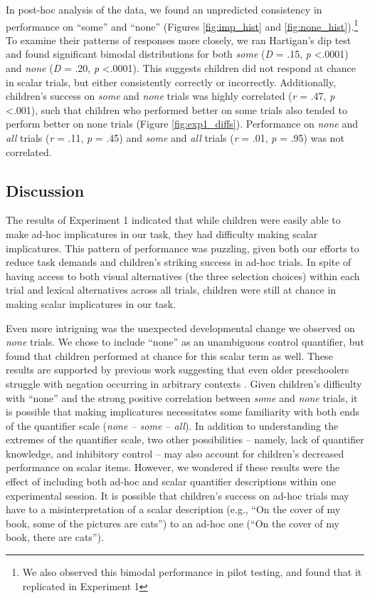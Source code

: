 \documentclass[man]{apa2}
\begin{document}
In post-hoc analysis of the data, we found an unpredicted consistency in performance on ``some'' and ``none'' (Figures \ref{fig:imp_hist} and \ref{fig:none_hist}).\footnote{We also observed this bimodal performance in pilot testing, and found that it replicated in Experiment 1}  To examine their patterns of responses more closely, we ran Hartigan's dip test and found significant bimodal distributions for both \textit{some} (\textit{D} = .15, \textit{p} \textless  .0001) and \textit{none} (\textit{D} = .20, \textit{p} \textless  .0001). This suggests children did not respond at chance in scalar trials, but either consistently correctly or incorrectly. Additionally, children's success on \textit{some} and \textit{none} trials was highly correlated (\textit{r} = .47, \textit{p} \textless  .001), such that children who performed better on some trials also tended to perform better on none trials (Figure \ref{fig:exp1_diffs}).  Performance on \textit{none} and \textit{all} trials (\textit{r} = .11, \textit{p} = .45) and \textit{some} and \textit{all} trials (\textit{r} = .01, \textit{p} = .95) was not correlated. 

\subsection{Discussion}

The results of Experiment 1 indicated that while children were easily able to make ad-hoc implicatures in our task, they had difficulty making scalar implicatures. This pattern of performance was puzzling, given both our efforts to reduce task demands and children's striking success in ad-hoc trials. In spite of having access to both visual alternatives (the three selection choices) within each trial and lexical alternatives across all trials, children were still at chance in making scalar implicatures in our task. 

Even more intriguing was the unexpected developmental change we observed on \textit{none} trials. We chose to include ``none'' as an unambiguous control quantifier, but found that children performed at chance for this scalar term as well. These results are supported by previous work suggesting that even older preschoolers struggle with negation occurring in arbitrary contexts \cite{nordmeyer2014}. Given children's difficulty with ``none'' and the strong positive correlation between \textit{some} and \textit{none} trials, it is possible that making implicatures necessitates some familiarity with both ends of the quantifier scale (\textit{none -- some -- all}). In addition to understanding the extremes of the quantifier scale, two other possibilities -- namely, lack of quantifier knowledge, and inhibitory control -- may also account for children's decreased performance on scalar items. However, we wondered if these results were the effect of including both ad-hoc and scalar quantifier descriptions within one experimental session. It is possible that children's success on ad-hoc trials may have to a misinterpretation of a scalar description (e.g., ``On the cover of my book, some of the pictures are cats'') to an ad-hoc one (``On the cover of my book, there are cats''). 
\end{document}
